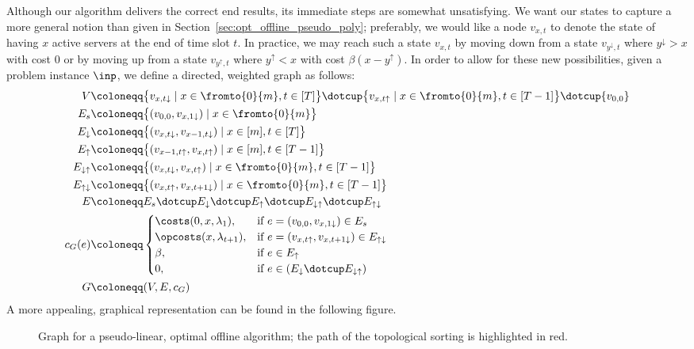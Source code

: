 Although our algorithm delivers the correct end results, its immediate steps are somewhat unsatisfying. We want our states to capture a more general notion than given in Section~\ref{sec:opt_offline_pseudo_poly}; preferably, we would like a node $v_{x,t}$ to denote the state of having $x$ active servers at the end of time slot $t$. In practice, we may reach such a state $v_{x,t}$ by moving down from a state $v_{y^\downarrow,t}$ where $y^\downarrow>x$ with cost $0$ or by moving up from a state $v_{y^\uparrow,t}$ where $y^\uparrow<x$ with cost $\beta(x-y^\uparrow)$. In order to allow for these new possibilities, given a problem instance $\inp$, we define a directed, weighted graph as follows:
\begin{align*}
	V&\coloneqq\bigl\{v_{x,t\downarrow}\mid x\in\fromto{0}{m},t\in[T]\bigr\}\dotcup\bigl\{v_{x,t\uparrow}\mid x\in\fromto{0}{m},t\in[T-1]\bigr\}\dotcup\{v_{0,0}\}\\
	E_s&\coloneqq\bigl\{(v_{0,0},v_{x,1\downarrow})\mid x\in\fromto{0}{m}\bigr\}\\
	E_\downarrow&\coloneqq\bigl\{(v_{x,t\downarrow},v_{x-1,t\downarrow})\mid x\in[m],t\in[T]\bigr\}\\
	E_\uparrow&\coloneqq\bigl\{(v_{x-1,t\uparrow},v_{x,t\uparrow})\mid x\in[m],t\in[T-1]\bigr\}\\
	E_{\downarrow\uparrow}&\coloneqq\bigl\{(v_{x,t\downarrow},v_{x,t\uparrow})\mid x\in\fromto{0}{m},t\in[T-1]\bigr\}\\
	E_{\uparrow\downarrow}&\coloneqq\bigl\{(v_{x,t\uparrow},v_{x,t+1\downarrow})\mid x\in\fromto{0}{m},t\in[T-1]\bigr\}\\
	E&\coloneqq E_s\dotcup E_\downarrow\dotcup E_\uparrow\dotcup E_{\downarrow\uparrow}\dotcup E_{\uparrow\downarrow}\\
	c_G(e)&\coloneqq
	\begin{cases}
		\costs(0,x,\lambda_1), & \text{if $e=(v_{0,0},v_{x,1\downarrow})\in E_s$}\\
		\opcosts(x,\lambda_{t+1}), & \text{if $e=(v_{x,t\uparrow},v_{x,t+1\downarrow})\in E_{\uparrow\downarrow}$}\\
		\beta, & \text{if $e\in E_\uparrow$}\\
		0, & \text{if $e\in(E_\downarrow\dotcup E_{\downarrow\uparrow})$}
	\end{cases}\\
	G&\coloneqq(V,E,c_G)
\end{align*}
A more appealing, graphical representation can be found in the following figure.
\begin{figure}[H]

\caption{Graph for a pseudo-linear, optimal offline algorithm; the path of the topological sorting is highlighted in red.}
\label{fig:graph_pseudo_lin}
\end{figure}
